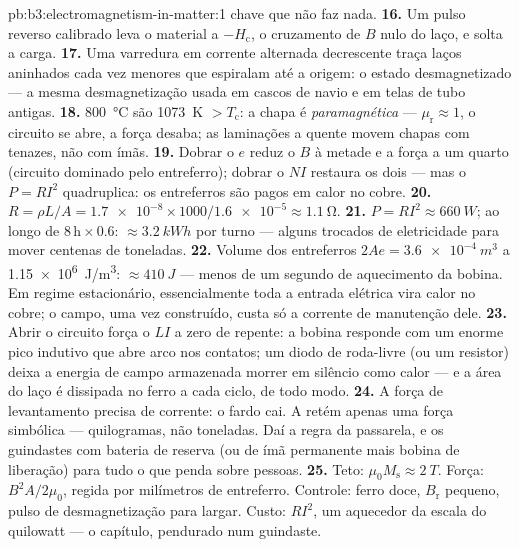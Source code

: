 \begin{solution}{pb:b3:electromagnetism-in-matter:1}
chave que não faz nada.
\textbf{16.} Um pulso reverso calibrado leva o material a
$-H_{\text{c}}$, o cruzamento de $B$ nulo do laço, e solta a
carga.
\textbf{17.} Uma varredura em corrente alternada decrescente traça laços
aninhados cada vez menores que espiralam até a origem: o estado
desmagnetizado --- a mesma desmagnetização usada em cascos de navio e em
telas de tubo antigas.
\textbf{18.} \qty{800}{\celsius} são \qty{1073}{K} $> T_{\text{c}}$:
a chapa é \emph{paramagnética} --- $\mu_{\text{r}} \approx 1$,
o circuito se abre, a força desaba; as laminações a quente movem chapas
com tenazes, não com ímãs.
\textbf{19.} Dobrar o $e$ reduz o $B$ à metade e a força a um quarto
(circuito dominado pelo entreferro); dobrar o $NI$ restaura os dois --- mas
o $P = RI^2$ quadruplica: os entreferros são pagos em calor no cobre.
\textbf{20.} $R = \rho L/A = \num{1.7e-8}\times1000/
\num{1.6e-5} \approx \qty{1.1}{\ohm}$.
\textbf{21.} $P = RI^2 \approx \qty{660}{W}$; ao longo de
$8\,\text{h}\times0.6$: $\approx\qty{3.2}{kWh}$ por turno ---
alguns trocados de eletricidade para mover centenas de toneladas.
\textbf{22.} Volume dos entreferros $2Ae = \qty{3.6e-4}{m^3}$ a
\qty{1.15e6}{J/m^3}: $\approx\qty{410}{J}$ --- menos de um
segundo de aquecimento da bobina. Em regime estacionário, essencialmente
toda a entrada elétrica vira calor no cobre; o campo, uma vez construído,
custa só a corrente de manutenção dele.
\textbf{23.} Abrir o circuito força o $LI$ a zero de repente:
a bobina responde com um enorme pico indutivo que abre arco nos
contatos; um diodo de roda-livre (ou um resistor) deixa a energia de
campo armazenada morrer em silêncio como calor --- e a área do laço é
dissipada no ferro a cada ciclo, de todo modo.
\textbf{24.} A força de levantamento precisa de corrente: o fardo cai.
A  retém apenas uma força simbólica --- quilogramas, não toneladas.
Daí a regra da passarela, e os guindastes com bateria de reserva (ou de
ímã permanente mais bobina de liberação) para tudo o que penda sobre pessoas.
\textbf{25.} Teto: $\mu_0M_{\text{s}} \approx \qty{2}{T}$.
Força: $B^2A/2\mu_0$, regida por milímetros de entreferro. Controle:
ferro doce, $B_{\text{r}}$ pequeno, pulso de desmagnetização para largar. Custo:
$RI^2$, um aquecedor da escala do quilowatt --- o capítulo, pendurado num
guindaste.
\end{solution}
